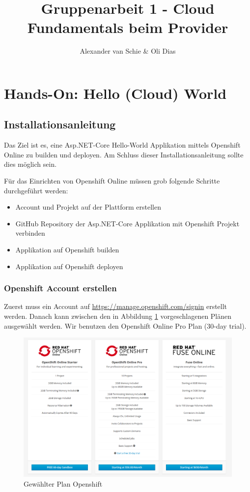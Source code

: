 \documentclass[12pt,a4paper]{article}
\author{Alexander van Schie \& Oli Dias}
\title{Gruppenarbeit 1 - Cloud Fundamentals beim Provider}
\begin{document}
\maketitle
\newpage
\tableofcontents
\newpage
\section{Hands-On: Hello (Cloud) World}
\subsection{Installationsanleitung}
Das Ziel ist es, eine Asp.NET-Core Hello-World Applikation mittels Openshift Online zu builden und deployen. Am Schluss dieser Installationsanleitung sollte dies möglich sein.


Für das Einrichten von Openshift Online müssen grob folgende Schritte durchgeführt werden:
\begin{itemize}
	\item Account und Projekt auf der Plattform erstellen
	\item GitHub Repository der Asp.NET-Core Applikation mit Openshift Projekt verbinden
	\item Applikation auf Openshift builden
	\item Applikation auf Openshift deployen
\end{itemize}
\subsubsection{Openshift Account erstellen}
Zuerst muss ein Account auf  \url{https://manage.openshift.com/signin} erstellt werden. Danach kann zwischen den in Abbildung \ref{fig:openshift-plan} vorgeschlagenen Plänen ausgewählt werden. Wir benutzen den Openshift Online Pro Plan (30-day trial).
\begin{figure}[h]
	\centering
	\includegraphics[width=0.7\linewidth]{img/openshift-plan}
	\caption{Gewählter Plan Openshift}
	\label{fig:openshift-plan}
\end{figure}
\end{document}
